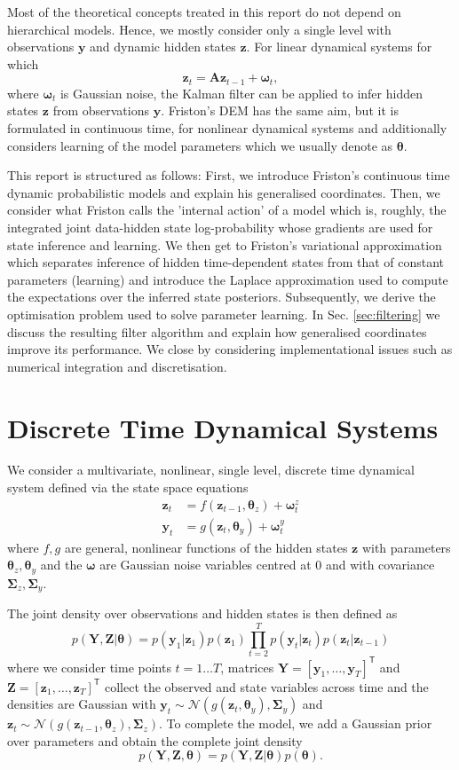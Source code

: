\documentclass[a4paper,10pt]{article}
\newcommand{\bs}[1]{\mathbf{#1}}					%
\newcommand{\bgs}[1]{\boldsymbol{#1}}				%
\newcommand{\tr}{\mathsf{T}}				%
\newcommand{\eq}[1]{\begin{equation} #1 \end{equation}}%
\renewcommand{\ss}{z}         %
\newcommand{\so}{y}         %
\newcommand{\sn}{\omega} %
\renewcommand{\sp}{\theta}    %
\newcommand{\ps}{\bs{\ss}}    %
\newcommand{\po}{\bs{\so}}    %
\newcommand{\pn}{\bgs{\sn}} %
\newcommand{\pp}{\bgs{\sp}} %
\newcommand{\Ps}{\bs{Z}}    %
\newcommand{\Po}{\bs{Y}}    %
\newcommand{\N}{\mathcal{N}}			%
\newcommand{\Cov}{\bgs{\Sigma}}			%
\begin{document}
Most of the theoretical concepts treated in this report do not depend on hierarchical models. Hence, we mostly consider only a single level with observations $\po$ and dynamic hidden states $\ps$. For linear dynamical systems for which
\eq{
    \ps_t = \bs{A}\ps_{t-1} + \pn_{t},
}
where $\pn_{t}$ is Gaussian noise, the Kalman filter can be applied to infer hidden states $\ps$ from observations $\po$. Friston's DEM has the same aim, but it is formulated in continuous time, for nonlinear dynamical systems and additionally considers learning of the model parameters which we usually denote as $\pp$.

This report is structured as follows: First, we introduce Friston's continuous time dynamic probabilistic models and explain his generalised coordinates. Then, we consider what Friston calls the 'internal action' of a model which is, roughly, the integrated joint data-hidden state log-probability whose gradients are used for state inference and learning. We then get to Friston's variational approximation which separates inference of hidden time-dependent states from that of constant parameters (learning) and introduce the Laplace approximation used to compute the expectations over the inferred state posteriors. Subsequently, we derive the optimisation problem used to solve parameter learning. In Sec. \ref{sec:filtering} we discuss the resulting filter algorithm and explain how generalised coordinates improve its performance. We close by considering implementational issues such as numerical integration and discretisation.


\section{Discrete Time Dynamical Systems}
We consider a multivariate, nonlinear, single level, discrete time dynamical system defined via the state space equations
\begin{align}
    \label{eq:linmodel_dyn}\ps_t &= f(\ps_{t-1}, \pp_{\ss}) + \pn_t^{\ss}\\
    \label{eq:linmodel_obs}\po_t &= g(\ps_t, \pp_{\so}) + \pn_t^{\so}
\end{align}
where $f, g$ are general, nonlinear functions of the hidden states $\ps$ with parameters $\pp_{\ss}, \pp_{\so}$ and the $\pn$ are Gaussian noise variables centred at 0 and with covariance $\Cov_{\ss}, \Cov_{\so}$.

The joint density over observations and hidden states is then defined as
\eq{
    p(\Po,\Ps|\pp) = p(\po_1|\ps_1)p(\ps_1)\prod_{t=2}^T p(\po_t|\ps_t)p(\ps_t|\ps_{t-1})
}
where we consider time points $t=1\dots T$, matrices $\Po = [\po_1, \dots, \po_T]^\tr$ and $\Ps = [\ps_1, \dots, \ps_T]^\tr$ collect the observed and state variables across time and the densities are Gaussian with $\po_t \sim \N(g(\ps_t, \pp_{\so}), \Cov_{\so})$ and $\ps_t \sim \N(g(\ps_{t-1}, \pp_{\ss}), \Cov_{\ss})$. To complete the model, we add a Gaussian prior over parameters and obtain the complete joint density
\eq{
    p(\Po,\Ps,\pp) = p(\Po,\Ps|\pp)p(\pp).
}
\end{document}
